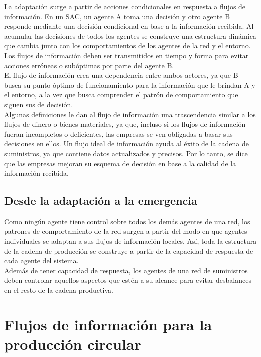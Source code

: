 \documentclass[runningheads]{llncs}
\begin{document}
La adaptación surge a partir de acciones condicionales en respuesta a
flujos de información. En un SAC, un agente A toma una decisión y otro
agente B responde mediante una decisión condicional en base a la
información recibida. Al acumular las decisiones de todos los agentes se
construye una estructura dinámica que cambia junto con los
comportamientos de los agentes de la red y el entorno. Los flujos de
información deben ser transmitidos en tiempo y forma para evitar
acciones erróneas o subóptimas por parte del agente B.\\

El flujo de información crea una dependencia entre ambos actores, ya que
B busca su punto óptimo de funcionamiento para la información que le
brindan A y el entorno, a la vez que busca comprender el patrón de
comportamiento que siguen sus de decisión.\\

Algunas definiciones le dan al flujo de información una trascendencia
similar a los flujos de dinero o bienes materiales, ya que, incluso si
los flujos de información fueran incompletos o deficientes, las empresas
se ven obligadas a basar sus decisiones en ellos. Un flujo ideal de
información ayuda al éxito de la cadena de suministros, ya que contiene
datos actualizados y precisos. Por lo tanto, se dice que las empresas
mejoran su esquema de decisión en base a la calidad de la información
recibida.

\hypertarget{desde-la-adaptaciuxf3n-a-la-emergencia}{%
\subsection{Desde la adaptación a la
emergencia}\label{desde-la-adaptaciuxf3n-a-la-emergencia}}

Como ningún agente tiene control sobre todos los demás agentes de una
red, los patrones de comportamiento de la red surgen a partir del modo
en que agentes individuales se adaptan a sus flujos de información
locales. Así, toda la estructura de la cadena de producción se construye
a partir de la capacidad de respuesta de cada agente del sistema.\\

Además de tener capacidad de respuesta, los agentes de una red de
suministros deben controlar aquellos aspectos que estén a su alcance
para evitar desbalances en el resto de la cadena productiva.

\hypertarget{flujos-de-informaciuxf3n-para-la-producciuxf3n-circular}{%
\section{Flujos de información para la producción
circular}\label{flujos-de-informaciuxf3n-para-la-producciuxf3n-circular}}
\end{document}
